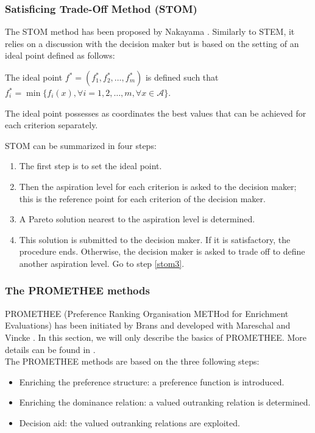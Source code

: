 \subsubsection{Satisficing Trade-Off Method (STOM)}
The STOM method has been proposed by Nakayama \cite{nakayama84}. Similarly to STEM, it relies on a discussion with the decision maker but is based on the setting of an ideal point defined as follows:
\begin{definition}
The ideal point $f^*=(f_1^*, f_2^*, \dots, f_m^*)$ is defined such that $f_i^* = \min \{f_i(x), \forall i=1, 2, \dots, m, \forall x \in \mathcal{A}\}$.
\end{definition}
The ideal point possesses as coordinates the best values that can be achieved for each criterion separately.

STOM can be summarized in four steps:
\begin{enumerate}
\item The first step is to set the ideal point.
\item Then the aspiration level for each criterion is asked to the decision maker; this is the reference point for each criterion of the decision maker.
\item \label{stom3} A Pareto solution nearest to the aspiration level is determined.
\item This solution is submitted to the decision maker. If it is satisfactory, the procedure ends. Otherwise, the decision maker is asked to trade off to define another aspiration level. Go to step \ref{stom3}.
\end{enumerate}

\subsubsection{The PROMETHEE methods}
PROMETHEE (Preference Ranking Organisation METHod for Enrichment Evaluations) has been initiated by Brans \cite{Brans1} and developed with Mareschal \cite{mares2ejor88} and Vincke \cite{BransMarechalVincke84}. In this section, we will only describe the basics of PROMETHEE. More details can be found in \cite{Beh2010}.\\
The PROMETHEE methods are based on the three following steps:
\begin{itemize}
\item Enriching the preference structure: a preference function is introduced.
\item Enriching the dominance relation: a valued outranking relation is determined.
\item Decision aid: the valued outranking relations are exploited.
\end{itemize}

